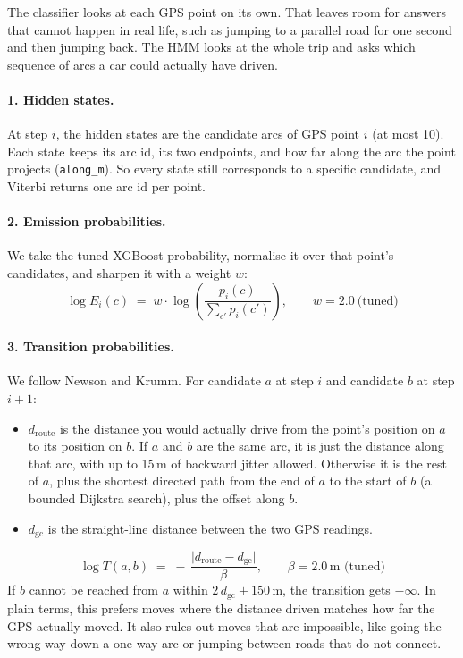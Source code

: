\documentclass[11pt,a4paper]{article}
\newcommand{\code}[1]{\texttt{\small #1}}
\begin{document}
The classifier looks at each GPS point on its own. That leaves room for answers that cannot happen in real
life, such as jumping to a parallel road for one second and then jumping back. The HMM looks at the whole
trip and asks which sequence of arcs a car could actually have driven.

\paragraph{1. Hidden states.}
At step $i$, the hidden states are the candidate arcs of GPS point $i$ (at most 10). Each state keeps its arc
id, its two endpoints, and how far along the arc the point projects (\code{along\_m}). So every state still
corresponds to a specific candidate, and Viterbi returns one arc id per point.

\paragraph{2. Emission probabilities.}
We take the tuned XGBoost probability, normalise it over that point's candidates, and sharpen it with a
weight $w$:
\[
\log E_i(c) \;=\; w \cdot \log\!\left(\frac{p_i(c)}{\sum_{c'} p_i(c')}\right), \qquad w = 2.0\ \text{(tuned)}
\]

\paragraph{3. Transition probabilities.}
We follow Newson and Krumm. For candidate $a$ at step $i$ and candidate $b$ at step $i+1$:
\begin{itemize}
  \item $d_\text{route}$ is the distance you would actually drive from the point's position on $a$ to its
        position on $b$. If $a$ and $b$ are the same arc, it is just the distance along that arc, with up to
        15\,m of backward jitter allowed. Otherwise it is the rest of $a$, plus the shortest directed path from
        the end of $a$ to the start of $b$ (a bounded Dijkstra search), plus the offset along $b$.
  \item $d_\text{gc}$ is the straight-line distance between the two GPS readings.
\end{itemize}
\[
\log T(a,b) \;=\; -\,\frac{\lvert d_\text{route} - d_\text{gc}\rvert}{\beta}, \qquad \beta = 2.0\,\text{m (tuned)}
\]
If $b$ cannot be reached from $a$ within $2\,d_\text{gc} + 150$\,m, the transition gets $-\infty$.
In plain terms, this prefers moves where the distance driven matches how far the GPS actually moved. It
also rules out moves that are impossible, like going the wrong way down a one-way arc or jumping between
roads that do not connect.
\end{document}
